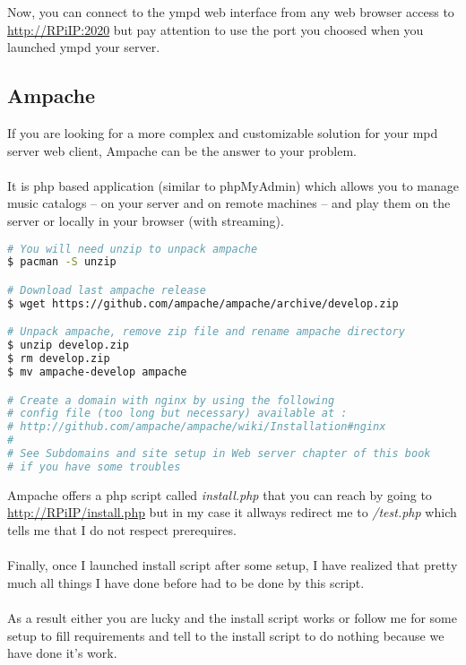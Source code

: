 Now, you can connect to the ympd web interface from any web browser access to 
\href{http://RPiIP:2020}{http://RPiIP:2020} but pay attention to use the port 
you choosed when you launched ympd your server.

\subsection{Ampache}
If you are looking for a more complex and customizable solution for your mpd 
server web client, Ampache can be the answer to your problem.
\\\\
It is php based application (similar to phpMyAdmin) which allows you to manage 
music catalogs  -- on your server and on remote machines -- and play them on the 
server or locally in your browser (with streaming).

\begin{lstlisting}[language=bash,caption=Download Ampache]
# You will need unzip to unpack ampache 
$ pacman -S unzip

# Download last ampache release
$ wget https://github.com/ampache/ampache/archive/develop.zip

# Unpack ampache, remove zip file and rename ampache directory
$ unzip develop.zip 
$ rm develop.zip
$ mv ampache-develop ampache

# Create a domain with nginx by using the following
# config file (too long but necessary) available at :
# http://github.com/ampache/ampache/wiki/Installation#nginx
#
# See Subdomains and site setup in Web server chapter of this book
# if you have some troubles
\end{lstlisting}

Ampache offers a php script called \emph{install.php} that you can reach by going 
to \href{http://RPiIP/install.php}{http://RPiIP/install.php} but in my case it 
allways redirect me to \emph{/test.php} which tells me that I do not respect 
prerequires.
\\\\
Finally, once I launched install script after some setup, I have realized that 
pretty much all things I have done before had to be done by this script. 
\\\\
As a result either you are lucky and the install script works or follow me for 
some setup to fill requirements and tell to the install script to do nothing 
because we have done it's work.

